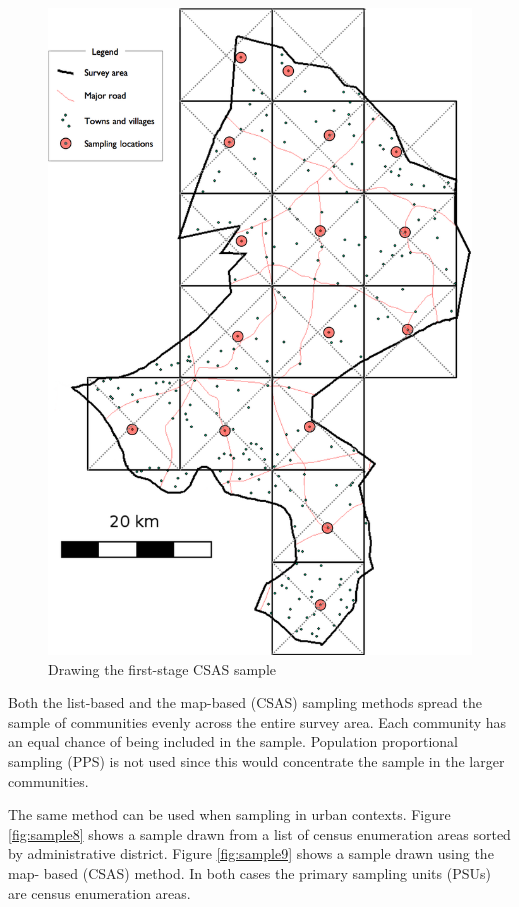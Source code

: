 \documentclass[12pt,a4paper]{book}
\theoremstyle{definition}
\theoremstyle{definition}
\theoremstyle{definition}
\theoremstyle{remark}
\begin{document}
\begin{figure}[H]

{\centering \includegraphics[width=800pt]{figures/mapSample3} 

}

\caption{Drawing the first-stage CSAS sample}\label{fig:sample7}
\end{figure}

Both the list-based and the map-based (CSAS) sampling methods spread the
sample of communities evenly across the entire survey area. Each
community has an equal chance of being included in the sample.
Population proportional sampling (PPS) is not used since this would
concentrate the sample in the larger communities.

The same method can be used when sampling in urban contexts. Figure
\ref{fig:sample8} shows a sample drawn from a list of census enumeration
areas sorted by administrative district. Figure \ref{fig:sample9} shows
a sample drawn using the map- based (CSAS) method. In both cases the
primary sampling units (PSUs) are census enumeration areas.
\end{document}
